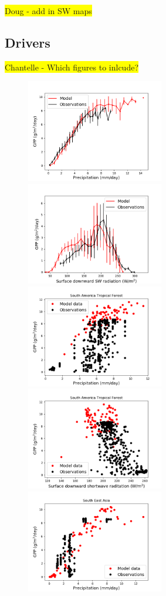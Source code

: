 \documentclass[bg, manuscript]{copernicus}
\newcommand{\hilight}[1]{\colorbox{yellow}{#1}}
\begin{document}
\hilight{Doug - add in SW maps}





\subsection{Drivers}
\hilight{Chantelle - Which figures to inlcude?}
\begin{figure}[t]
    \includegraphics[width=6cm]{figs/GPPresponse/tl.png}
    \includegraphics[width=6cm]{figs/GPPresponse/tr.png}
    \includegraphics[width=6cm]{figs/GPPresponse/ml.png}
    \includegraphics[width=6cm]{figs/GPPresponse/mr.png}
    \includegraphics[width=6cm]{figs/GPPresponse/bl.png}

\end{figure}
\end{document}
